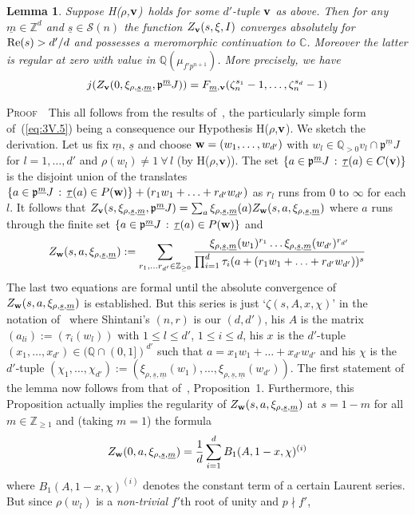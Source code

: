 \documentclass[12pt]{article}
\newtheorem{lemma}{Lemma}[section]
\newcounter{rem}[section]%
\newcommand{\bbC}{\ensuremath{\mathbb{C}}}
\newcommand{\bbQ}{\ensuremath{\mathbb{Q}}}
\newcommand{\bbZ}{\ensuremath{\mathbb{Z}}}
\newcommand{\beql}[1]{\begin{equation}\label{#1}}
\newcommand{\bPf}{\noindent \textsc{Proof\ }}
\newcommand{\bv}{\ensuremath{{\bf v}}}
\newcommand{\bw}{\ensuremath{{\bf w}}}
\newcommand{\cS}{\ensuremath{\mathcal{S}}}
\newcommand{\eeq}{\end{equation}}
\newcommand{\fp}{\ensuremath{\mathfrak{p}}}
\newcommand{\ndiv}{\nmid}
\newcommand{\refeq}[1]{~(\ref{eq:#1})}
\newcommand{\rem}{\refstepcounter{rem}\noindent{\sc Remark \therem}}%
\renewcommand{\therem}{\thesection.\arabic{rem}}
\newcommand{\Hrhov}{H($\rho$,$\bv$)}
\newcommand{\um}{\ensuremath{{\underline{m}}}}
\newcommand{\us}{\ensuremath{{\underline{s}}}}
\newcommand{\utau}{\ensuremath{{\underline{\tau}}}}
\begin{document}
\begin{lemma}\label{lemma:3J} Suppose \Hrhov\ holds for some $d'$-tuple $\bv$ as above.
Then for any $\um\in\bbZ^d$ and $\us\in\cS(n)$
the function
$Z_{\bv}(s,\xi,I)$ converges absolutely for ${\rm Re}(s)>d'/d$
and possesses a meromorphic continuation to $\bbC$.
Moreover the latter is regular at zero with value
in $\bbQ(\mu_{f'p^{n+1}})$. More precisely, we have
\beql{eq:3V.5}
j(Z_{\bv}(0,\xi_{\rho,\us,\um},\fp^\um J))=F_{\um,\bv}(\zeta_n^{s_1}-1,\ldots,\zeta_n^{s_d}-1)
\eeq
\end{lemma}
\bPf\ This all follows from the results of~\cite{Shi},
the particularly simple form of\refeq{3V.5} being a consequence our Hypothesis \Hrhov.
We sketch the derivation.
Let us fix $\um$, $\us$ and
choose $\bw=(w_1,\ldots,w_{d'})$ with
$w_l\in\bbQ_{>0} v_l\cap \fp^\um J$ for $l=1,\ldots,d'$ and $\rho(w_l)\neq 1\ \forall\,l$
(by \Hrhov).
The set
$\{a\in\fp^{\um} J\,:\,\utau(a)\in C(\bv)\}$
is the disjoint union of the translates
$\{a\in\fp^{\um} J\,:\,\utau(a)\in P(\bw)\}+
(r_1w_1+\ldots+r_{d'}w_{d'})$
as $r_l$ runs from $0$ to $\infty$ for each $l$.
It follows that
$Z_{\bv}(s,\xi_{\rho,\us,\um},\fp^\um J)=
\sum_a \xi_{\rho,\us,\um}(a)Z_{\bw}(s,a,\xi_{\rho,\us,\um})$
where $a$ runs through the finite set
$\{a\in\fp^{\um} J\,:\,\utau(a)\in P(\bw)\}$
and
\[
Z_{\bw}(s,a,\xi_{\rho,\us,\um}):=\sum_{r_1,\ldots r_{d'}\in\bbZ_{\geq 0}}
\frac{\xi_{\rho,\us,\um}(w_1)^{r_1}\ldots \xi_{\rho,\us,\um}(w_{d'})^{r_{d'}}}
{\prod_{i=1}^d\tau_i(a+(r_1w_1+\ldots+r_{d'}w_{d'}))^s}
\]
The last two equations are formal until the absolute convergence of
$Z_{\bw}(s,a,\xi_{\rho,\us,\um})$ is established. But this series is just
`$\zeta(s,A,x,\chi)$' in the notation of~\cite[p.~396]{Shi} where Shintani's
$(n,r)$ is our $(d,d')$, his $A$ is the matrix
$(a_{li}):=(\tau_i(w_l))$ with $1\leq l\leq d'$, $1\leq i\leq d$, his $x$ is the $d'$-tuple
$(x_1,\ldots,x_{d'})\in (\bbQ\cap (0,1])^{d'}$ such that $a=x_1w_1+\ldots+x_{d'}w_{d'}$
and his $\chi$ is the $d'$-tuple
$(\chi_1,\ldots,\chi_{d'}):=(\xi_{\rho,\us,\um}(w_1),\ldots,\xi_{\rho,\us,\um}(w_{d'}))$.
The first statement of the lemma now follows from that of~\cite{Shi}, Proposition~1.
Furthermore, this Proposition actually implies the regularity of
$Z_{\bw}(s,a,\xi_{\rho,\us,\um})$
at $s={1-m}$ for all
$m\in\bbZ_{\geq 1}$ and (taking $m=1$) the formula
\[
Z_{\bw}(0,a,\xi_{\rho,\us,\um})=\frac{1}{d}\sum_{i=1}^d B_1(A,1-x,\chi)^{(i)}
\]
where $B_1(A,1-x,\chi)^{(i)}$ denotes the constant term of a certain Laurent series.
But since $\rho(w_l)$ is a \emph{non-trivial} $f'$th root of unity and $p\ndiv f'$,
\end{document}
